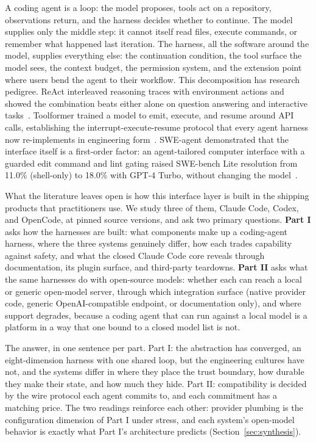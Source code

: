 \documentclass{article}
\newcommand{\codex}[0]{Codex}
\newcommand{\occ}[0]{OpenCode}
\newcommand{\ccc}[0]{Claude Code}
\begin{document}
A coding agent is a loop: the model proposes, tools act on a repository,
observations return, and the harness decides whether to continue. The
model supplies only the middle step: it cannot itself read files, execute
commands, or remember what happened last iteration. The harness, all the
software around the model, supplies everything else: the continuation
condition, the tool surface the model sees, the context budget, the
permission system, and the extension point where users bend the agent to
their workflow. This decomposition has research pedigree. ReAct
interleaved reasoning traces with environment actions and showed the
combination beats either alone on question answering and interactive
tasks~\citep{yao2023react}. Toolformer
trained a model to emit, execute, and resume around API calls,
establishing the interrupt-execute-resume protocol that every agent harness
now re-implements in engineering form~\citep{schick2023toolformer}. SWE-agent
demonstrated that the interface itself is a first-order factor: an
agent-tailored computer interface with a guarded edit command and lint
gating raised SWE-bench Lite resolution from 11.0\% (shell-only) to 18.0\%
with GPT-4 Turbo, without changing the model~\citep{yang2024sweagent}.

What the literature leaves open is how this interface layer is built in
the shipping products that practitioners use. We study three of
them, \ccc{}, \codex{}, and \occ{}, at pinned source versions, and ask
two primary questions. \textbf{Part I} asks how the harnesses are built:
what components make up a coding-agent harness, where the three systems
genuinely differ, how each trades capability against safety, and what
the closed \ccc{} core reveals through documentation, its plugin
surface, and third-party teardowns. \textbf{Part II} asks what the same
harnesses do with open-source models: whether each can reach a local or
generic open-model server, through which integration surface (native
provider code, generic OpenAI-compatible endpoint, or documentation
only), and where support degrades, because a coding agent that can run
against a local model is a platform in a way that one bound to a closed
model list is not.

The answer, in one sentence per part. Part I: the abstraction has
converged, an eight-dimension harness with one shared loop, but the
engineering cultures have not, and the systems differ in where they
place the trust boundary, how durable they make their state, and how
much they hide. Part II: compatibility is decided by the wire protocol
each agent commits to, and each commitment has a matching price. The two
readings reinforce each other: provider plumbing is the configuration
dimension of Part I under stress, and each system's open-model behavior
is exactly what Part I's architecture predicts
(Section~\ref{sec:synthesis}).
\end{document}
